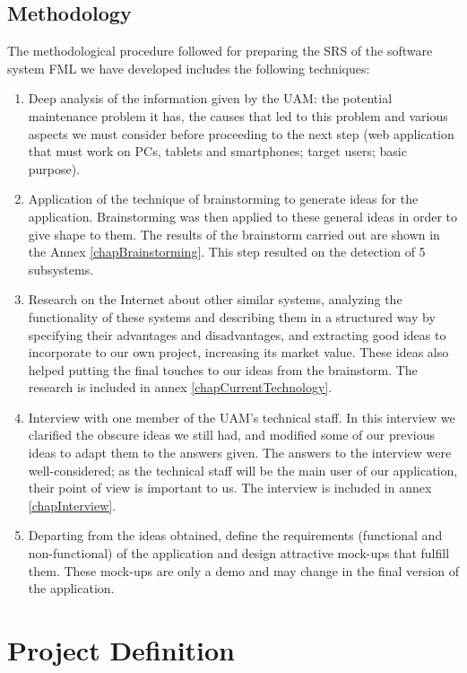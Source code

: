 \documentclass{report}
\begin{document}
\section{Methodology}

The methodological procedure followed for preparing the SRS of the software system FML we have developed includes the following techniques:
\begin{enumerate}
\item Deep analysis of the information given by the UAM: the potential maintenance problem it has, the causes that led to this problem and various aspects we must consider before proceeding to the next step (web application that must work on PCs, tablets and smartphones; target users; basic purpose).
\item Application of the technique of brainstorming to generate ideas for the application. Brainstorming was then applied to these general ideas in order to give shape to them. The results of the brainstorm carried out are shown in the Annex \ref{chapBrainstorming}. This step resulted on the detection of 5 subsystems.
\item Research on the Internet about other similar systems, analyzing the functionality of these systems and describing them in a structured way by specifying their advantages and disadvantages, and extracting good ideas to incorporate to our own project, increasing its market value. These ideas also helped putting the final touches to our ideas from the brainstorm. The research is included in annex \ref{chapCurrentTechnology}.
\item Interview with one member of the UAM's technical staff. In this interview we clarified the obscure ideas we still had, and modified some of our previous ideas to adapt them to the answers given. The answers to the interview were well-considered; as the technical staff will be the main user of our application, their point of view is important to us. The interview is included in annex \ref{chapInterview}.
\item Departing from the ideas obtained, define the requirements (functional and non-functional) of the application and design attractive mock-ups that fulfill them. These mock-ups are only a demo and may change in the final version of the application.
\end{enumerate}

\chapter{Project Definition}
\label{chapProjectDefinition}
\end{document}
